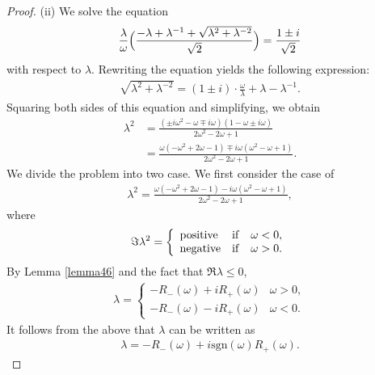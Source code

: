 \documentclass[a4paper,12pt]{article}
\theoremstyle{plain}
\theoremstyle{definition}
\theoremstyle{definition}
\begin{document}
\begin{proof}
($\mathrm{ii}$) We solve the equation
\begin{eqnarray*}
\frac{\lambda}{\omega}\Bigl(\frac{-\lambda +\lambda^{-1}+\sqrt{\lambda^2 +\lambda^{-2}}}{\sqrt{2}}\Bigr)=\frac{1\pm i}{\sqrt{2}}
\end{eqnarray*}
with respect to $\lambda$.
Rewriting the equation yields the following expression:
\begin{align}
    \label{416}
    \sqrt{\lambda^2+\lambda^{-2}}=(1\pm i)\cdot \frac{\omega}{\lambda}+\lambda-\lambda^{-1}.
\end{align}
Squaring both sides of this equation and simplifying, we obtain
\begin{align}
\lambda^2 &= \frac{(\pm i\omega^2 - \omega \mp i\omega)(1-\omega \pm i\omega )}{2\omega^2 -2\omega +1} \nonumber \\
&= \frac{\omega (-\omega ^2 +2\omega -1) \mp i\omega (\omega ^2 -\omega +1)}{2\omega ^2 -2\omega +1}. \nonumber
 \end{align}
We divide the problem into two case. We first consider the case of 
\begin{align*}
\lambda ^2= \frac{\omega (-\omega ^2 +2\omega -1) - i\omega (\omega ^2 -\omega +1)}{2\omega ^2 -2\omega +1},
 \end{align*}
where
\begin{eqnarray*}
\Im \lambda^2 = \left\{
\begin{array}{ll}
{\rm positive} &  {\rm if} \quad  \omega <0,\\
{\rm negative} & {\rm if} \quad \omega >0.
\end{array}
\right. 
\end{eqnarray*}
By Lemma \ref{lemma46} and the fact that $\Re \lambda \leq 0$,
\begin{eqnarray*}
\lambda = \left\{
\begin{array}{ll}
-R_{-}(\omega)+iR_{+}(\omega) &   \omega >0,\\
-R_{-}(\omega)-iR_{+}(\omega) &  \omega <0.
\end{array}
\right.
\end{eqnarray*}
It follows from the above that $\lambda$ can be written as
\begin{align*}
    \lambda = -R_{-}(\omega)+i\mathrm{sgn}(\omega)R_{+}(\omega).
\end{align*}


\end{proof}
\end{document}

